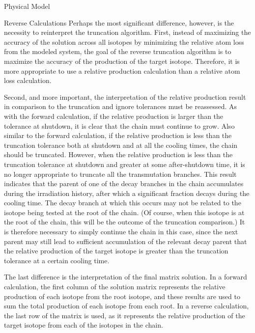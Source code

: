 \begin{chapter}{Physical Model\label{chap:physical}}
\begin{section}{Reverse Calculations\label{sec:physical.reverse}}
  Perhaps the most significant difference, however, is the necessity
  to reinterpret the truncation algorithm.  First, instead of
  maximizing the accuracy of the solution across all isotopes by
  minimizing the relative atom loss from the modeled system, the goal
  of the reverse truncation algorithm is to maximize the accuracy of
  the production of the target isotope.  Therefore, it is more
  appropriate to use a relative production calculation than a relative
  atom loss calculation.  
  
  Second, and more important, the interpretation of the relative
  production result in comparison to the truncation and ignore
  tolerances must be reassessed.  As with the forward calculation, if
  the relative production is larger than the tolerance at shutdown, it
  is clear that the chain must continue to grow.  Also similar to the
  forward calculation, if the relative production is less than the
  truncation tolerance both at shutdown and at all the cooling times,
  the chain should be truncated.  However, when the relative
  production is less than the truncation tolerance at shutdown and
  greater at some after-shutdown time, it is no longer appropriate to
  truncate all the transmutation branches.  This result indicates that
  the parent of one of the decay branches in the chain accumulates
  during the irradiation history, after which a significant fraction
  decays during the cooling time.  The decay branch at which this
  occurs may not be related to the isotope being tested at the root of
  the chain.  (Of course, when this isotope is at the root of the
  chain, this will be the outcome of the truncation comparison.)  It
  is therefore necessary to simply continue the chain in this case,
  since the next parent may still lead to sufficient accumulation of
  the relevant decay parent that the relative production of the target
  isotope is greater than the truncation tolerance at a certain
  cooling time.
  
  The last difference is the interpretation of the final matrix
  solution.  In a forward calculation, the first column of the
  solution matrix represents the relative production of each isotope
  from the root isotope, and these results are used to sum the total
  production of each isotope from each root.  In a reverse
  calculation, the last row of the matrix is used, as it represents
  the relative production of the target isotope from each of the
  isotopes in the chain.

\end{section}


\end{chapter}
